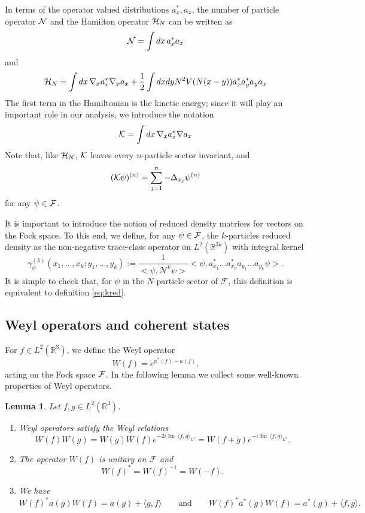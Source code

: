 \documentclass[11pt,a4paper,DIV11]{scrartcl}	%
\newtheorem{lem}[thm]{Lemma}
\newcommand{\bR}{{\mathbb R}}
\newcommand{\cF}{{\cal F}}
\newcommand{\cK}{{\cal K}}
\newcommand{\cH}{{\cal H}}
\newcommand{\cN}{{\cal N}}
\newcommand{\R}{\mathds{R}}
\newcommand{\fock}{\mathcal{F}}		%
\newcommand{\Ncal}{\mathcal{N}}		%
\newcommand{\scal}[2]{\big<#1,#2\big>} %
\renewcommand{\Im}{\operatorname{Im}\,} 	%
\newcommand{\be}[1]{\begin{equation}\label{eq:#1}}	%
\newcommand{\ee}{\end{equation}}
\begin{document}
In terms of the operator valued distributions $a_x^*,a_x$, the number of particle operator $\cN$ 
and the Hamilton operator $\cH_N$ can be written as
\[ \cN = \int dx \, a_x^* a_x \]
and 
\begin{equation}\label{eq:ham-F} \cH_N = \int dx \, \nabla_x a_x^* \nabla_x a_x + \frac{1}{2} \int dx dy N^2 V(N (x-y)) a^*_x a^*_y a_y a_x \end{equation}
The first term in the Hamiltonian is the kinetic energy; since it will play an important role in our analysis, we introduce the notation 
\[ \cK = \int dx \, \nabla_x a_x^* \nabla a_x \]
Note that, like $\cH_N$, $\cK$ leaves every $n$-particle sector invariant, and
\[ (\cK \psi)^{(n)} = \sum_{j=1}^n -\Delta_{x_j} \psi^{(n)} \]
for any $\psi \in \cF$. 

It is important to introduce the notion of reduced density matrices for vectors on the Fock space. To this end, we define, for any $\psi \in \cF$, the $k$-particles reduced density as the non-negative trace-class
operator on $L^2 (\bR^{3k})$ with integral kernel 
\be{fock_density}
\gamma_{\psi}^{(k)}(x_1, \dots, x_k ; y_1, \dots , y_k) := \frac{1}{\scal{\psi}{\Ncal^k \psi}} \scal{\psi}{a^*_{x_1} \dots a^*_{x_k} a_{y_1} \dots a_{y_k} \psi}.
\ee
It is simple to check that, for $\psi$ in the $N$-particle sector of $\fock$, this definition is equivalent to definition \eqref{eq:kred}.

\subsection{Weyl operators and coherent states}

For $f \in L^2(\R^3)$, we define the Weyl operator 
\[
  W(f) = e^{a^*(f) - a(f)}.
\]
acting on the Fock space $\cF$. In the following lemma we collect some well-known properties of Weyl operators.
\begin{lem}\label{l:W}
  Let $f, g \in L^2(\R^3)$.
  \begin{enumerate}
    \item \label{l:W1} Weyl operators satisfy the Weyl relations
      \[
        W(f) W(g) = W(g) W(f) e^{-2i \Im \langle f, g \rangle_{L^2}} = W(f+g)
        e^{-i \Im \langle f, g \rangle_{L^2}}.
      \]
    \item \label{l:W2} The operator $W(f)$ is unitary on $\mathcal{F}$ and
      \[
        W(f)^* = W(f)^{-1} = W(-f).
      \]
    \item \label{l:W3} We have
      \begin{equation}\label{eq:W3}
        W(f)^* a (g)  W(f) = a (g) + \langle g, f \rangle  \qquad \text{and} \qquad W(f)^* a^* (g)
        W(f) = a^* (g) + \langle f, g \rangle.
      \end{equation}
 \end{enumerate}
\end{lem}
\end{document}
